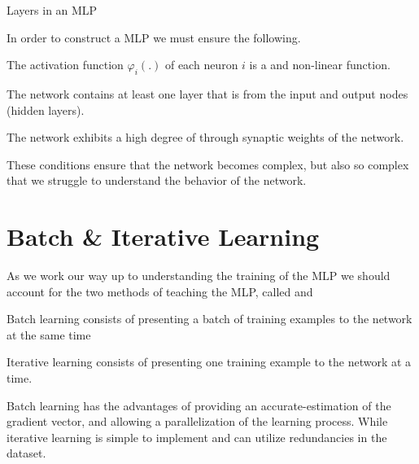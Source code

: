\begin{marginfigure} \centering \caption{Layers in an MLP} \label{layers}  \end{marginfigure}

In order to construct a MLP we must ensure the following.
\begin{bullets}
	\item The activation function $\varphi_i (.)$ of each neuron $i$ is a  and non-linear function.
	\item The network contains at least one layer that is  from the input and output nodes (hidden layers).
	\item The network exhibits a high degree of  through synaptic weights of the network.
\end{bullets}
These conditions ensure that the network becomes complex, but also so complex that we struggle to understand the behavior of the network.

\section{Batch \& Iterative Learning}

As we work our way up to understanding the training of the MLP we should account for the two methods of teaching the MLP, called  and 
\begin{bullets}
	\item Batch learning consists of presenting a batch of training examples to the network at the same time
	\item Iterative learning consists of presenting one training example to the network at a time.
\end{bullets}

Batch learning has the advantages of  providing an accurate-estimation of the gradient vector, and allowing a parallelization of the learning process. While iterative learning is simple to implement and can utilize redundancies in the dataset.
